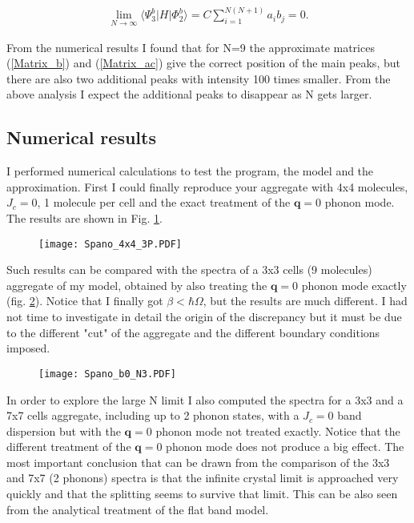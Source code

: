 \documentclass[pt12]{article}
\newcommand{\bfq}{\mathbf{q}}
\begin{document}
\begin{eqnarray}
\lim_{N\rightarrow\infty}\langle \Psi^b_3 |H| \Phi^b_2 \rangle = C
\sum_{i=1}^{N(N+1)}  a_i b_j = 0.
\end{eqnarray}

From the numerical results I found that for N=9 the approximate
matrices (\ref{Matrix_b}) and (\ref{Matrix_ac}) give the correct
position of the main peaks, but there are also two additional peaks
with intensity 100 times smaller. From the above analysis I expect
the additional peaks to disappear as N gets larger.

\subsection{Numerical results}

I performed numerical calculations to test the program, the model
and the approximation. First I could finally reproduce your
aggregate with 4x4 molecules, $J_c=0$, 1 molecule per cell and the
exact treatment of the $\bfq=0$ phonon mode. The results are shown
in Fig. \ref{Fig_Spano_4x4_3P}.

\begin{figure}
\begin{center}
  \texttt{[image: Spano\_4x4\_3P.PDF]}
  \caption{}  \label{Fig_Spano_4x4_3P}
\end{center}
\end{figure}

Such results can be compared with the spectra of a 3x3 cells (9
molecules) aggregate of my model, obtained by also treating the
$\bfq=0$ phonon mode exactly (fig. \ref{Fig_Spano_b0_N3}). Notice
that I finally got $\beta<\hbar\Omega$, but the results are much
different. I had not time to investigate in detail the origin of the
discrepancy but it must be due to the different "cut" of the
aggregate and the different boundary conditions imposed.

\begin{figure}
\begin{center}
  \texttt{[image: Spano\_b0\_N3.PDF]}
  \caption{}\label{Fig_Spano_b0_N3}
\end{center}
\end{figure}

In order to explore the large N limit I also computed the spectra
for a 3x3 and a 7x7 cells aggregate, including up to 2 phonon
states, with a $J_c=0$ band dispersion but with the $\bfq=0$ phonon
mode not treated exactly. Notice that the different treatment of the
$\bfq=0$ phonon mode does not produce a big effect. The most
important conclusion that can be drawn from the comparison of the
3x3 and 7x7 (2 phonons) spectra is that the infinite crystal limit
is approached very quickly and that the splitting seems to survive
that limit. This can be also seen from the analytical treatment of
the flat band model.
\end{document}
